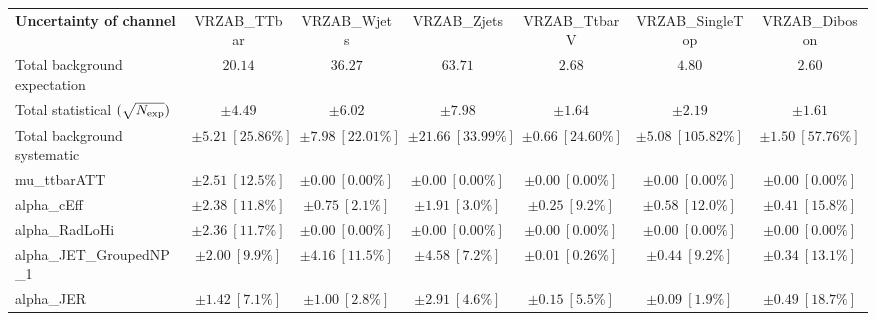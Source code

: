 
\begin{sidewaystable}
\begin{center}
\setlength{\tabcolsep}{0.0pc}
\begin{tabular*}{\textwidth}{@{\extracolsep{\fill}}lcccccc}
\noalign{\smallskip}\hline\noalign{\smallskip}
{\bf Uncertainty of channel}                                    & VRZAB\_TTbar            & VRZAB\_Wjets            & VRZAB\_Zjets            & VRZAB\_TtbarV            & VRZAB\_SingleTop            & VRZAB\_Diboson            \\
\noalign{\smallskip}\hline\noalign{\smallskip}
Total background expectation             &  $20.14$        &  $36.27$        &  $63.71$        &  $2.68$        &  $4.80$        &  $2.60$       \\
\noalign{\smallskip}\hline\noalign{\smallskip}
Total statistical $(\sqrt{N_{\rm exp}})$              & $\pm 4.49$        & $\pm 6.02$        & $\pm 7.98$        & $\pm 1.64$        & $\pm 2.19$        & $\pm 1.61$       \\
Total background systematic               & $\pm 5.21\ [25.86\%] $        & $\pm 7.98\ [22.01\%] $        & $\pm 21.66\ [33.99\%] $        & $\pm 0.66\ [24.60\%] $        & $\pm 5.08\ [105.82\%] $        & $\pm 1.50\ [57.76\%] $             \\
\noalign{\smallskip}\hline\noalign{\smallskip}
\noalign{\smallskip}\hline\noalign{\smallskip}
mu\_ttbarATT         & $\pm 2.51\ [12.5\%] $          & $\pm 0.00\ [0.00\%] $          & $\pm 0.00\ [0.00\%] $          & $\pm 0.00\ [0.00\%] $          & $\pm 0.00\ [0.00\%] $          & $\pm 0.00\ [0.00\%] $       \\
alpha\_cEff         & $\pm 2.38\ [11.8\%] $          & $\pm 0.75\ [2.1\%] $          & $\pm 1.91\ [3.0\%] $          & $\pm 0.25\ [9.2\%] $          & $\pm 0.58\ [12.0\%] $          & $\pm 0.41\ [15.8\%] $       \\
alpha\_RadLoHi         & $\pm 2.36\ [11.7\%] $          & $\pm 0.00\ [0.00\%] $          & $\pm 0.00\ [0.00\%] $          & $\pm 0.00\ [0.00\%] $          & $\pm 0.00\ [0.00\%] $          & $\pm 0.00\ [0.00\%] $       \\
alpha\_JET\_GroupedNP\_1         & $\pm 2.00\ [9.9\%] $          & $\pm 4.16\ [11.5\%] $          & $\pm 4.58\ [7.2\%] $          & $\pm 0.01\ [0.26\%] $          & $\pm 0.44\ [9.2\%] $          & $\pm 0.34\ [13.1\%] $       \\
alpha\_JER         & $\pm 1.42\ [7.1\%] $          & $\pm 1.00\ [2.8\%] $          & $\pm 2.91\ [4.6\%] $          & $\pm 0.15\ [5.5\%] $          & $\pm 0.09\ [1.9\%] $          & $\pm 0.49\ [18.7\%] $       \\

\end{tabular*}
\end{center}
\end{sidewaystable}

